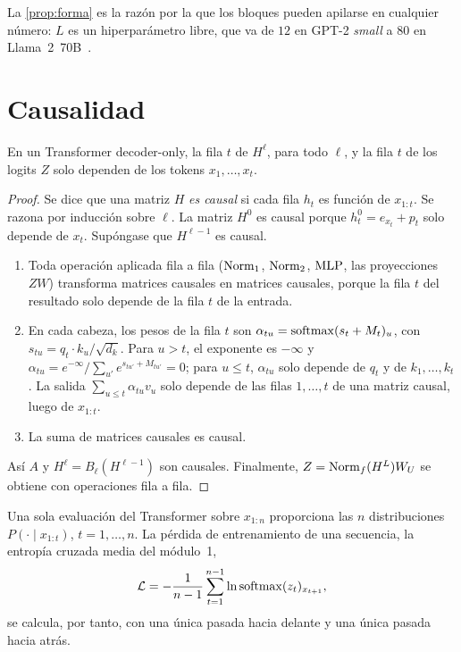La \cref{prop:forma} es la razón por la que los bloques pueden apilarse en cualquier número: $L$ es un hiperparámetro libre, que va de $12$ en GPT-2 \emph{small} a $80$ en Llama~2~70B~\cite{gpt2,llama2}.

\section{Causalidad}

\begin{proposicion}\label{prop:causal}
En un Transformer decoder-only, la fila $t$ de $H^{\ell}$, para todo $\ell$, y la fila $t$ de los logits $Z$ solo dependen de los tokens $x_1,\dots,x_t$.
\end{proposicion}

\begin{proof}
Se dice que una matriz $H$ \emph{es causal} si cada fila $h_t$ es función de $x_{1:t}$. Se razona por inducción sobre $\ell$. La matriz $H^{0}$ es causal porque $h^{0}_t=e_{x_t}+p_t$ solo depende de $x_t$. Supóngase que $H^{\ell-1}$ es causal.
\begin{enumerate}
  \item Toda operación aplicada fila a fila ($\operatorname{Norm}_1$, $\operatorname{Norm}_2$, $\operatorname{MLP}$, las proyecciones $ZW$) transforma matrices causales en matrices causales, porque la fila $t$ del resultado solo depende de la fila $t$ de la entrada.
  \item En cada cabeza, los pesos de la fila $t$ son $\alpha_{tu}=\operatorname{softmax}(s_t+M_t)_u$, con $s_{tu}=q_t\cdot k_u/\sqrt{d_k}$. Para $u>t$, el exponente es $-\infty$ y $\alpha_{tu}=e^{-\infty}/\sum_{u'}e^{s_{tu'}+M_{tu'}}=0$; para $u\le t$, $\alpha_{tu}$ solo depende de $q_t$ y de $k_1,\dots,k_t$. La salida $\sum_{u\le t}\alpha_{tu}v_u$ solo depende de las filas $1,\dots,t$ de una matriz causal, luego de $x_{1:t}$.
  \item La suma de matrices causales es causal.
\end{enumerate}
Así $A$ y $H^{\ell}=B_\ell(H^{\ell-1})$ son causales. Finalmente, $Z=\operatorname{Norm}_f(H^{L})W_U$ se obtiene con operaciones fila a fila.
\end{proof}

\begin{corolario}\label{cor:paralelo}
Una sola evaluación del Transformer sobre $x_{1:n}$ proporciona las $n$ distribuciones $P(\cdot\mid x_{1:t})$, $t=1,\dots,n$. La pérdida de entrenamiento de una secuencia, la entropía cruzada media del módulo~1,
\[
\mathcal{L}=-\frac{1}{n-1}\sum_{t=1}^{n-1}\ln\operatorname{softmax}(z_t)_{x_{t+1}},
\]
se calcula, por tanto, con una única pasada hacia delante y una única pasada hacia atrás.
\end{corolario}

